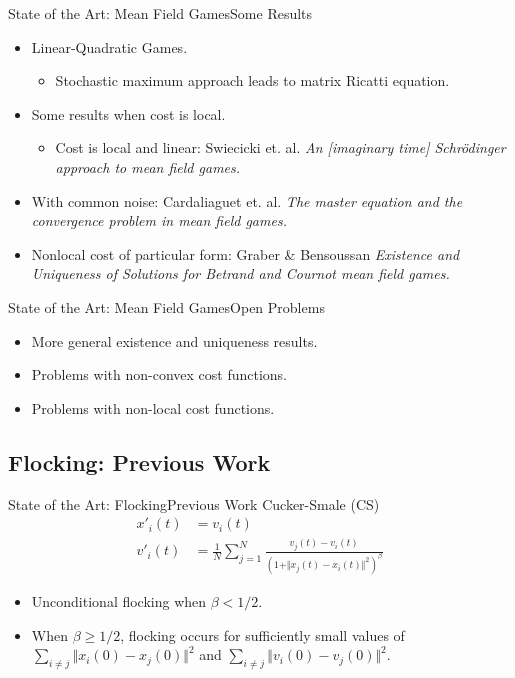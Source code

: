 \documentclass{beamer}
\begin{document}
\begin{frame}{State of the Art: Mean Field Games}{Some Results}
	\begin{itemize}
		\item {
			Linear-Quadratic Games.
		}
		\begin{itemize}
			\item Stochastic maximum approach leads to matrix Ricatti equation.
		\end{itemize}
		\item Some results when cost is local.
		\begin{itemize}
			\item Cost is local and linear: Swiecicki et. al. \textit{An [imaginary time] Schr{\"o}dinger approach to mean field games.}
		\end{itemize}
		\item With common noise: Cardaliaguet et. al. \textit{The master equation and the convergence problem in mean field games.}
		\item Nonlocal cost of particular form: Graber \& Bensoussan \textit{Existence and Uniqueness of Solutions for Betrand and Cournot mean field games.}
	\end{itemize}
\end{frame}

\begin{frame}{State of the Art: Mean Field Games}{Open Problems}
	\begin{itemize}
		\item {
			More general existence and uniqueness results.
		}
		\item {
			Problems with non-convex cost functions.
		}
		\item {
			Problems with non-local cost functions.
		}
	\end{itemize}
\end{frame}

\subsection{Flocking: Previous Work}

\begin{frame}{State of the Art: Flocking}{Previous Work}
	Cucker-Smale (CS)
	\begin{equation}
				\begin{split}
				x'_i(t)&=v_i(t)\\
				v'_i(t)&=\frac{1}{N}\sum_{j=1}^N\frac{v_j(t)-v_i(t)}{(1+\Vert x_j(t)-x_i(t) \Vert^2)^\beta}
				\end{split}
	\end{equation}
	\begin{itemize}
		\item {
			Unconditional flocking when $\beta < 1/2$.
		}
		\item {
			When $\beta \geq 1/2$, flocking occurs for sufficiently small values of $\sum_{i \neq j}\Vert x_i(0)-x_j(0)\Vert^2$ and $\sum_{i \neq j}\Vert v_i(0)-v_j(0)\Vert^2$.
		}
	\end{itemize}
\end{frame}
\end{document}
